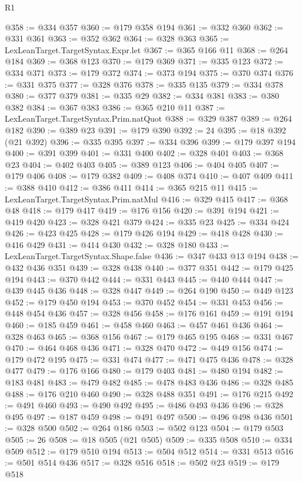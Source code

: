 \begin{lexlean}{R1}
\begin{coremodule}
@358 := @334 @357
@360 := @179 @358 @194
@361 := @332 @360
@362 := @331 @361
@363 := @352 @362
@364 := @328 @363
@365 := LexLeanTarget.TargetSyntax.Expr.let
@367 := @365 @166 @11
@368 := @264 @184
@369 := @368 @123
@370 := @179 @369
@371 := @335 @123
@372 := @334 @371
@373 := @179 @372
@374 := @373 @194
@375 := @370 @374
@376 := @331 @375
@377 := @328 @376
@378 := @335 @135
@379 := @334 @378
@380 := @377 @379
@381 := @335 @29
@382 := @334 @381
@383 := @380 @382
@384 := @367 @383
@386 := @365 @210 @11
@387 := LexLeanTarget.TargetSyntax.Prim.natQuot
@388 := @329 @387
@389 := @264 @182
@390 := @389 @23
@391 := @179 @390
@392 := 24
@395 := @18 @392 (@21 @392)
@396 := @335 @395
@397 := @334 @396
@399 := @179 @397 @194
@400 := @391 @399
@401 := @331 @400
@402 := @328 @401
@403 := @368 @23
@404 := @402 @403
@405 := @389 @123
@406 := @404 @405
@407 := @179 @406
@408 := @179 @382
@409 := @408 @374
@410 := @407 @409
@411 := @388 @410
@412 := @386 @411
@414 := @365 @215 @11
@415 := LexLeanTarget.TargetSyntax.Prim.natMul
@416 := @329 @415
@417 := @368 @48
@418 := @179 @417
@419 := @176 @156
@420 := @391 @194
@421 := @419 @420
@423 := @328 @421 @379
@424 := @335 @23
@425 := @334 @424
@426 := @423 @425
@428 := @179 @426 @194
@429 := @418 @428
@430 := @416 @429
@431 := @414 @430
@432 := @328 @180
@433 := LexLeanTarget.TargetSyntax.Shape.false
@436 := @347 @433 @13 @194
@438 := @432 @436 @351
@439 := @328 @438
@440 := @377 @351
@442 := @179 @425 @194
@443 := @370 @442
@444 := @331 @443
@445 := @440 @444
@447 := @439 @445 @436
@448 := @328 @447
@449 := @264 @190
@450 := @449 @123
@452 := @179 @450 @194
@453 := @370 @452
@454 := @331 @453
@456 := @448 @454 @436
@457 := @328 @456
@458 := @176 @161
@459 := @191 @194
@460 := @185 @459
@461 := @458 @460
@463 := @457 @461 @436
@464 := @328 @463
@465 := @368 @156
@467 := @179 @465 @195
@468 := @331 @467
@470 := @464 @468 @436
@471 := @328 @470
@472 := @449 @156
@474 := @179 @472 @195
@475 := @331 @474
@477 := @471 @475 @436
@478 := @328 @477
@479 := @176 @166
@480 := @179 @403
@481 := @480 @194
@482 := @183 @481
@483 := @479 @482
@485 := @478 @483 @436
@486 := @328 @485
@488 := @176 @210 @460
@490 := @328 @488 @351
@491 := @176 @215
@492 := @491 @460
@493 := @490 @492
@495 := @486 @493 @436
@496 := @328 @495
@497 := @187 @459
@498 := @491 @497
@500 := @496 @498 @436
@501 := @328 @500
@502 := @264 @186
@503 := @502 @123
@504 := @179 @503
@505 := 26
@508 := @18 @505 (@21 @505)
@509 := @335 @508
@510 := @334 @509
@512 := @179 @510 @194
@513 := @504 @512
@514 := @331 @513
@516 := @501 @514 @436
@517 := @328 @516
@518 := @502 @23
@519 := @179 @518

\end{coremodule}
\end{lexlean}
